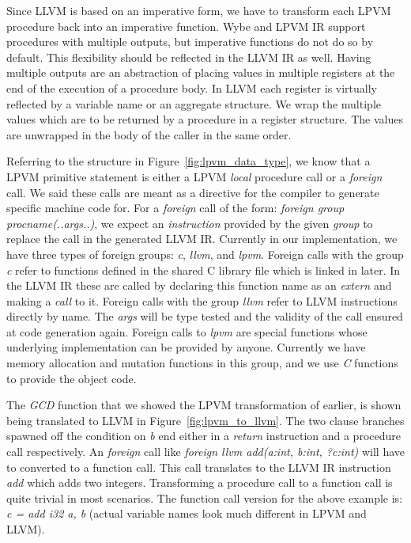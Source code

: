 Since LLVM is based on an imperative form, we have to transform each LPVM
procedure back into an imperative function. Wybe and LPVM IR support procedures
with multiple outputs, but imperative functions do not do so by default. This
flexibility should be reflected in the LLVM IR as well. Having multiple outputs
are an abstraction of placing values in multiple registers at the end of the
execution of a procedure body. In LLVM each register is virtually reflected by
a variable name or an aggregate structure. We wrap the multiple values which
are to be returned by a procedure in a register structure. The values are
unwrapped in the body of the caller in the same order.

Referring to the structure in Figure~\ref{fig:lpvm_data_type}, we know that a
LPVM primitive statement is either a LPVM \textit{local} procedure call or a
\textit{foreign} call. We said these calls are meant as a directive for the
compiler to generate specific machine code for. For a \textit{foreign} call of
the form: \textit{foreign group proc\textunderscore name(..args..)}, we expect
an \textit{instruction} provided by the given \textit{group} to replace the
call in the generated LLVM IR. Currently in our implementation, we have three
types of foreign groups: \textit{c}, \textit{llvm}, and \textit{lpvm}. Foreign
calls with the group \textit{c} refer to functions defined in the shared C
library file which is linked in later. In the LLVM IR these are called by
declaring this function name as an \textit{extern} and making a \textit{call}
to it. Foreign calls with the group \textit{llvm} refer to LLVM instructions
directly by name. The \textit{args} will be type tested and the validity of the
call ensured at code generation again. Foreign calls to \textit{lpvm} are
special functions whose underlying implementation can be provided by
anyone. Currently we have memory allocation and mutation functions in this
group, and we use \textit{C} functions to provide the object code.

The \textit{GCD} function that we showed the LPVM transformation of earlier, is
shown being translated to LLVM in Figure~\ref{fig:lpvm_to_llvm}. The two clause
branches spawned off the condition on \textit{b} end either in a
\textit{return} instruction and a procedure call respectively. An
\textit{foreign} call like \textit{foreign llvm add(a:int, b:int, ?c:int)} will
have to converted to a function call. This call translates to the LLVM IR
instruction \textit{add} which adds two integers. Transforming a procedure call
to a function call is quite trivial in most scenarios. The function call
version for the above example is: \textit{c = add i32 a, b} (actual variable
names look much different in LPVM and LLVM).


